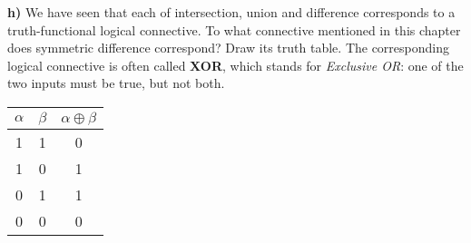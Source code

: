 \documentclass[titlepage, letterpaper, fleqn]{article}
\newcommand{\spacepls}{\vspace{5mm}}
\begin{document}
\spacepls

{\large \textbf{h)} We have seen that each of intersection, union and difference corresponds to a truth-functional logical connective. To what connective mentioned in this chapter does symmetric difference correspond? Draw its truth table.}
\spacepls
The corresponding logical connective is often called \textbf{XOR}, which stands for \textit{Exclusive OR}: one of the two inputs must be true, but not both.

\begin{table}[h!]
\centering
\begin{tabular}{@{}ccc@{}}
\toprule
$\alpha$ & $\beta$ & $\alpha \oplus \beta$ \\ \midrule
1 & 1 & 0 \\
1 & 0 & 1 \\
0 & 1 & 1 \\
0 & 0 & 0 \\ \bottomrule
\end{tabular}
\end{table}
\end{document}
